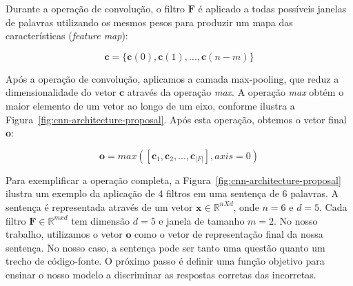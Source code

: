 Durante a operação de convolução, o filtro $\bm{F}$ é aplicado a todas possíveis janelas de palavras utilizando os mesmos pesos para produzir um mapa das características (\textit{feature map}):

\begin{equation}
\label{eq:feature-map}
    \bm{c} = \{ \bm{c}(0), \bm{c}(1), . . ., \bm{c}(n - m) \} 
\end{equation}




Após a operação de convolução, aplicamos a camada \gls{max-pooling}, que reduz a dimensionalidade do vetor $\bm{c}$ através da operação \textit{max}. A operação \textit{max} obtém o maior elemento de um vetor ao longo de um eixo, conforme ilustra a Figura~\ref{fig:cnn-architecture-proposal}. Após esta operação, obtemos o vetor final $\bm{o}$:

\begin{equation}
    \bm{o} = max\left(\left[\bm{c}_{1}, \bm{c}_{2}, . . ., \bm{c}_{|F|}\right], axis = 0\right)
\end{equation}

Para exemplificar a operação completa, a Figura~\ref{fig:cnn-architecture-proposal} ilustra um exemplo da aplicação de 4 filtros em uma sentença de 6 palavras. A sentença é representada através de um vetor $\bm{x} \in \mathbb{R}^{n X d}$, onde $n = 6$ e $d = 5$. Cada filtro $\bm{F} \in \mathbb{R}^{m x d}$ tem dimensão $d = 5$ e janela de tamanho $m = 2$. No nosso trabalho, utilizamos o vetor $\bm{o}$ como o vetor de representação final da nossa sentença. No nosso caso, a sentença pode ser tanto uma questão quanto um trecho de código-fonte. O próximo passo é definir uma função objetivo para ensinar o nosso modelo a discriminar as respostas corretas das incorretas.

